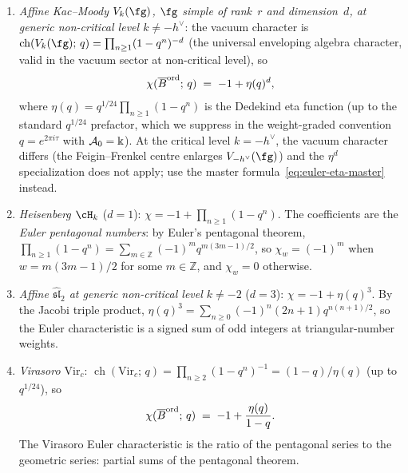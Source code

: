 \begin{corollary}
\label{cor:euler-eta-specializations}
\begin{enumerate}[label=\textup{(\roman*)}]
\item \emph{Affine Kac--Moody $V_k(\fg)$, $\fg$ simple of
 rank~$r$ and dimension~$d$, at generic non-critical level
 $k\ne -h^\vee$}:
 the vacuum character is
 $\operatorname{ch}(V_k(\fg);\,q)
 =\prod_{n\ge 1}(1-q^n)^{-d}$
 (the universal enveloping algebra character, valid in
 the vacuum sector at non-critical level), so
 \begin{equation}\label{eq:euler-eta-affine}
 \chi(\overline{B}^{\mathrm{ord}};\,q)
 \;=\;
 -1+\eta(q)^d,
 \end{equation}
 where $\eta(q)=q^{1/24}\prod_{n\ge 1}(1-q^n)$ is the
 Dedekind eta function (up to the standard $q^{1/24}$
 prefactor, which we suppress in the weight-graded
 convention $q=e^{2\pi i\tau}$ with
 $\mathcal{A}_0=\Bbbk$). At the critical level $k=-h^\vee$,
 the vacuum character differs (the Feigin--Frenkel
 centre enlarges $V_{-h^\vee}(\fg)$) and the
 $\eta^d$ specialization does not apply; use the
 master formula~\eqref{eq:euler-eta-master} instead.
\item \emph{Heisenberg $\cH_k$} ($d=1$):
 $\chi=-1+\prod_{n\ge 1}(1-q^n)$. The coefficients
 are the \emph{Euler pentagonal numbers}: by
 Euler's pentagonal theorem,
 $\prod_{n\ge 1}(1-q^n)
 =\sum_{m\in\mathbb Z}(-1)^m q^{m(3m-1)/2}$,
 so $\chi_w=(-1)^m$ when $w=m(3m{-}1)/2$ for some
 $m\in\mathbb Z$, and $\chi_w=0$ otherwise.
\item \emph{Affine $\widehat{\mathfrak{sl}}_2$ at generic
 non-critical level $k\ne -2$} ($d=3$):
 $\chi=-1+\eta(q)^3$. By the Jacobi triple product,
 $\eta(q)^3
 =\sum_{n\ge 0}(-1)^n(2n{+}1)q^{n(n+1)/2}$,
 so the Euler characteristic is a signed sum of odd
 integers at triangular-number weights.
\item \emph{Virasoro $\mathrm{Vir}_c$}:
 $\operatorname{ch}(\mathrm{Vir}_c;\,q)
 =\prod_{n\ge 2}(1-q^n)^{-1}=(1{-}q)/\eta(q)$
 (up to $q^{1/24}$), so
 \begin{equation}\label{eq:euler-eta-virasoro}
 \chi(\overline{B}^{\mathrm{ord}};\,q)
 \;=\;
 -1+\frac{\eta(q)}{1-q}.
 \end{equation}
 The Virasoro Euler characteristic is the ratio of
 the pentagonal series to the geometric series: partial
 sums of the pentagonal theorem.
\end{enumerate}
\end{corollary}

